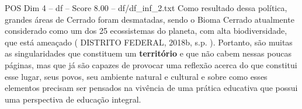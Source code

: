 \begin{textsample}{POS Dim 4 – df – Score 8.00 – df/df\_inf\_2.txt}
Como resultado dessa política, grandes áreas de Cerrado foram desmatadas, sendo o Bioma Cerrado atualmente considerado como um dos 25 ecossistemas do planeta, com alta biodiversidade, que está ameaçado ( DISTRITO FEDERAL, 2018b, s.p. ).
Portanto, são muitas as singularidades que constituem um \textbf{território} e que não cabem nessas poucas páginas, mas que já são capazes de provocar uma reflexão acerca do que constitui esse lugar, seus povos, seu ambiente natural e cultural e sobre como esses elementos precisam ser pensados na vivência de uma prática educativa que possui uma perspectiva de educação integral.

\end{textsample}
